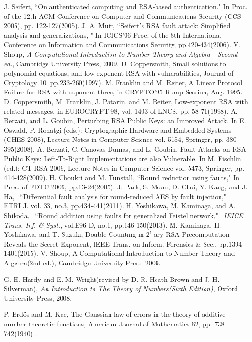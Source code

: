 \documentclass{article}
\begin{document}
\begin{thebibliography}{}
 J. Seifert, 
``On authenticated computing and RSA-based authentication." In Proc. of the 12th
ACM Conference on Computer and Communications Security (CCS 2005), pp. 122-127(2005).
 J. A. Muir, ``Seifert's RSA fault attack: Simplified analysis and generalizations, "
In ICICS'06 Proc. of the 8th International Conference on Information and Communications Security, 
pp.420-434(2006).
 V. Shoup, 
{\it A Computational Introduction to Number Theory and Algebra - Second ed.}, 
Cambridge University Press, 2009.
D. Coppersmith, Small solutions to polynomial
equations, and low exponent RSA with vulnerabilities,
Journal of Cryptology 10, pp.233-260(1997).
M. Franklin and M. Reiter, A Linear Protocol Failure for RSA with exponent three, in
CRYPTO'95 Rump Session, Aug. 1995.
D. Coppersmith, M. Franklin, J. Patarin, and
M. Reiter, Low-exponent RSA with related
messages, in EUROCRYPT'98, vol. 1403 of
LNCS, pp. 58-71(1998).
 A. Berzati, and L. Goubin, 
Perturbing RSA Public Keys: an Improved Attack. In 
E. Oswald, P. Rohatgi (eds.): Cryptographic Hardware and
Embedded Systems (CHES 2008), Lecture Notes in Computer Science vol. 5154, Springer, 
pp. 380-395(2008).
 A. Berzati, C. Canovas-Dumas, and L. Goubin, 
Fault Attacks on RSA Public Keys: Left-To-Right Implementations are also Vulnerable. In 
M. Fischlin (ed.): CT-RSA 2009, Lecture Notes in Computer Science vol. 5473, Springer, 
pp. 414-428(2009).
 H. Choukri and M. Tunstall,
``Round reduction using faults," In Proc. of FDTC 2005, pp.13-24(2005).
 J. Park, S. Moon, D. Choi, Y. Kang, and J. Ha,~
``Differential fault analysis for round-reduced AES by fault injection,"~
ETRI J. vol. 33, no.3, pp.434-441(2011).
 H. Yoshikawa, M. Kaminaga, and A. Shikoda,~
``Round addition using faults for generalized Feistel network,"~
{\em IEICE Trans. Inf. \& Syst.}, vol.E96-D, no.1, pp.146-150(2013).
 M. Kaminaga, H. Yoshikawa, and T. Suzuki, 
Double Counting in $2^t$-ary RSA Precomputation Reveals the Secret Exponent, 
IEEE Trans. on Inform. Forensics \& Sec., pp.1394-1401(2015).
V. Shoup, A Computational Introduction to Number Theory and Algebra(2nd ed.), Cambridge University Press, 2009.

 G. H. Hardy and E. M. Wright(revised by D. R. Heath-Brown and J. H. Silverman), 
{\it An Introduction to The Theory of Numbers(Sixth Edition)}, Oxford University Press, 2008.

 P. Erd\"os and M. Kac, 
The Gaussian law of errors in the theory of additive number theoretic functions, 
American Journal of Mathematics 62, pp. 738-742(1940) .
\end{thebibliography}
\end{document}
